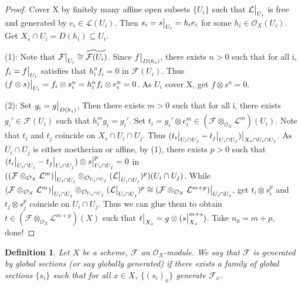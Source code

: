 \documentclass{ctexart}
\newtheorem{definition}{Definition}[section]
\begin{document}
\begin{proof}
    Cover X by finitely many affine open subsets $\{U_{i}\}$ such that $\mathcal{L}\big{|}_{U_{i}}$ is free and generated by $e_{i}\in \mathcal{L}(U_{i})$.
    Then $s_{i} = s\big{|}_{U_{i}} = h_{i}e_{i}$ for some $h_{i}\in \mathcal{O}_{X}(U_{i})$.
    Get $X_{s} \cap U_{i} = D(h_{i}) \subseteq U_{i}$.  
    \par
    (1): Note that $\mathcal{F}\big{|}_{U_{i}} \cong \widetilde{\mathcal{F}(U_{i})}$.
    Since $f\big{|}_{D(h_{i})}$, there exists $n > 0$ such that for all i, $f_{i} = f\big{|}_{U_{i}}$ satisfies that $h_{i}^{n}f_{i} = 0$ in $\mathcal{F}(U_{i})$.
    Thus $(f \otimes s)\big{|}_{U_{i}} = f_{i} \otimes s_{i}^{n} = h_{i}^{n}f_{i} \otimes e_{i}^{n} = 0$.
    As $U_{i}$ cover X, get $f \otimes s^{n} = 0$.
    \par
    (2): Set $g_{i} = g\big{|}_{D(h_{i})}$,
    Then there exists $m > 0$ such that for all i, there exists $g_{i}'\in \mathcal{F}(U_{i})$ such that $h_{i}^{m}g_{i} = g_{i}'$.
    Set $t_{i} = g_{i}' \otimes e_{i}^{m}\in (\mathcal{F} \otimes_{\mathcal{O}_{X}} \mathcal{L}^{m})(U_{i})$.
    Note that $t_{i}$ and $t_{j}$ coincide on $X_{s} \cap U_{i} \cap U_{j}$.
    Thus $(t_{i}\big{|}_{U_{i} \cap U_{j}} - t_{j}\big{|}_{U_{i} \cap U_{j}})\big{|}_{X_{s} \cap U_{i} \cap U_{j}}$.
    As $U_{i} \cap U_{j}$ is either noetherian or affine, by (1), there exists $p > 0$ such that $(t_{i}\big{|}_{U_{i} \cap U_{j}} - t_{j}\big{|}_{U_{i} \cap U_{j}}) \otimes s\big{|}_{U_{i} \cap U_{j}}^{p} = 0$ in $((\mathcal{F} \otimes_{\mathcal{O}_{X}} \mathcal{L}^{m})\big{|}_{U_{i} \cap U_{j}} \otimes_{\mathcal{O}_{U_{i} \cap U_{j}}} (\mathcal{L}\big{|}_{U_{i} \cap U_{j}})^{p})(U_{i} \cap U_{j})$.
    While $(\mathcal{F} \otimes_{\mathcal{O}_{X}} \mathcal{L}^{m})\big{|}_{U_{i} \cap U_{j}} \otimes_{\mathcal{O}_{U_{i} \cap U_{j}}} (\mathcal{L}\big{|}_{U_{i} \cap U_{j}})^{p} \cong (\mathcal{F} \otimes_{\mathcal{O}_{X}} \mathcal{L}^{m + p})\big{|}_{U_{i} \cap U_{j}}$, 
    get $t_{i} \otimes s_{i}^{p}$ and $t_{j} \otimes s_{j}^{p}$ coincide on $U_{i} \cap U_{j}$.
    Thus we can glue them to obtain $t\in (\mathcal{F} \otimes_{\mathcal{O}_{X}} \mathcal{L}^{m + p})(X)$ such that $t\big{|}_{X_{s}} = g \otimes (s\big{|}_{X_{s}}^{m + s})$.
    Take $n_{0} = m + p$, done! 
\end{proof}
\begin{definition}
    Let $X$ be a scheme, $\mathcal{F}$ an $\mathcal{O}_{X}$-module.
    We say that $\mathcal{F}$ is generated by global sections (or say globally generated) if there exists a family of global sections $\{s_{i}\}$ such that for all $x\in X$,
    $\{(s_{i})_{x}\}$ generate $\mathcal{F}_{x}$.
\end{definition}
\end{document}
